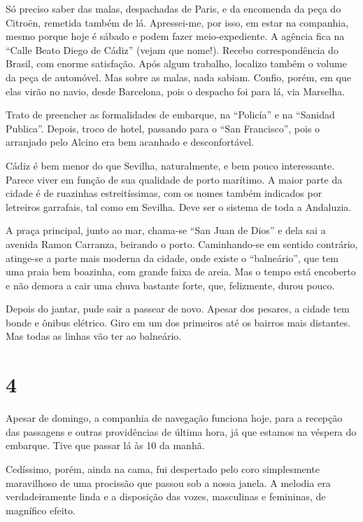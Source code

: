 Só preciso saber das malas, despachadas de Paris, e da encomenda da peça do Citroën, remetida também de lá. Apressei-me, por isso, em estar na companhia, mesmo porque hoje é sábado e podem fazer meio-expediente. A agência fica na ``Calle Beato Diego de Cádiz'' (vejam que nome!). Recebo correspondência do Brasil, com enorme satisfação. Após algum trabalho, localizo também o volume da peça de automóvel. Mas sobre as malas, nada sabiam. Confio, porém, em que elas virão no navio, desde Barcelona, pois o despacho foi para lá, via Marselha.

Trato de preencher as formalidades de embarque, na ``Policía'' e na ``Sanidad Publica''. Depois, troco de hotel, passando para o ``San Francisco'', pois o arranjado pelo Alcino era bem acanhado e desconfortável.

Cádiz é bem menor do que Sevilha, naturalmente, e bem pouco interessante. Parece viver em função de sua qualidade de porto marítimo. A maior parte da cidade é de ruazinhas estreitíssimas, com os nomes também indicados por letreiros garrafais, tal como em Sevilha. Deve ser o sistema de toda a Andaluzia.

A praça principal, junto ao mar, chama-se ``San Juan de Dios'' e dela sai a avenida Ramon Carranza, beirando o porto. Caminhando-se em sentido contrário, atinge-se a parte mais moderna da cidade, onde existe o ``balneário'', que tem uma praia bem boazinha, com grande faixa de areia. Mas o tempo está encoberto e não demora a cair uma chuva bastante forte, que, felizmente, durou pouco.

Depois do jantar, pude sair a passear de novo. Apesar dos pesares, a cidade tem bonde e ônibus elétrico. Giro em um dos primeiros até os bairros mais distantes. Mas todas as linhas vão ter ao balneário.

\section*{4 \adfflatleafright {}}
Apesar de domingo, a companhia de navegação funciona hoje, para a recepção das passagens e outras providências de última hora, já que estamos na véspera do embarque. Tive que passar lá às 10 da manhã.

Cedíssimo, porém, ainda na cama, fui despertado pelo coro simplesmente maravilhoso de uma procissão que passou sob a nossa janela. A melodia era verdadeiramente linda e a disposição das vozes, masculinas e femininas, de magnífico efeito.


